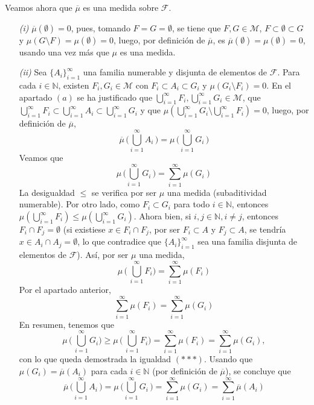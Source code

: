 \documentclass[11pt]{report}
\newcommand{\N}{\mathbb N}
\newcommand{\F}{\mathcal F}
\newcommand{\M}{\mathcal M}
\begin{document}
\begin{itemize}
    \vspace{2mm}

    Veamos ahora que $\overline{\mu}$ es una medida sobre $\F$.
    \begin{itemize}
        \item[\textit{(i)}] $\overline{\mu}(\emptyset)=0$, pues, tomando $F=G=\emptyset$, se tiene que $F,G \in \M$, $F \subset \emptyset \subset G$ y $\mu(G \setminus F) = \mu(\emptyset)=0$, luego, por definición de $\overline{\mu}$, es $\overline{\mu}(\emptyset) = \mu(\emptyset) = 0$, usando una vez más que $\mu$ es una medida.
        \item[\textit{(ii)}] Sea $\{A_i\}_{i=1}^\infty$ una familia numerable y disjunta de elementos de $\F$. Para cada $i \in \N$, existen $F_i,G_i \in \M$ con $F_i \subset A_i \subset G_i$ y $\mu(G_i \setminus F_i) = 0$. En el apartado $(a)$ se ha justificado que $\bigcup_{i=1}^\infty F_i,\bigcup_{i=1}^\infty G_i \in \M$, que $\bigcup_{i=1}^\infty F_i \subset \bigcup_{i=1}^\infty A_i \subset \bigcup_{i=1}^\infty G_i$ y que $\mu(\bigcup_{i=1}^\infty G_i \setminus \bigcup_{i=1}^\infty F_i) = 0$, luego, por definición de $\overline{\mu}$,
        \[\overline{\mu}\,\biggl(\bigcup_{i=1}^\infty A_i\,\biggr) = \mu\,\biggl(\bigcup_{i=1}^\infty G_i\,\biggr)\]
        Veamos que
        \[\mu\,\biggl(\bigcup_{i=1}^\infty G_i\,\biggr)=\sum_{i=1}^\infty \mu(G_i) \tag{$\ast\ast\ast$}\]
        La desigualdad $\leq$ se verifica por ser $\mu$ una medida (subaditividad numerable). Por otro lado, como $F_i \subset G_i$ para todo $i \in \N$, entonces $\mu(\bigcup_{i=1}^\infty F_i) \leq \mu(\bigcup_{i=1}^\infty G_i)$. Ahora bien, si $i,j \in \N, i \neq j$, entonces $F_i \cap F_j = \emptyset$ (si existiese $x \in F_i \cap F_j$, por ser $F_i \subset A$ y $F_j \subset A$, se tendría $x \in A_i \cap A_j=\emptyset$, lo que contradice que $\{A_i\}_{i=1}^\infty$ sea una familia disjunta de elementos de $\mathcal{F}$). Así, por ser $\mu$ una medida,
        \[\mu\,\biggl(\,\bigcup_{i=1}^\infty F_i \biggr)= \sum_{i=1}^\infty \mu(F_i)\]
        Por el apartado anterior,
        \[\sum_{i=1}^\infty \mu(F_i) = \sum_{i=1}^\infty \mu(G_i)\]
        En resumen, tenemos que
        \[\mu\,\biggl(\,\bigcup_{i=1}^\infty G_i \biggr) \geq \mu\,\biggl(\,\bigcup_{i=1}^\infty F_i \biggr)= \sum_{i=1}^\infty \mu(F_i)= \sum_{i=1}^\infty \mu(G_i),\]
        con lo que queda demostrada la igualdad $(\ast\ast\ast)$. Usando que $\mu(G_i) = \overline{\mu}(A_i)$ para cada $i \in \N$ (por definición de $\overline{\mu}$), se concluye que
        \[\overline{\mu}\,\biggl(\bigcup_{i=1}^\infty A_i\,\biggr) = \mu\,\biggl(\bigcup_{i=1}^\infty G_i\,\biggr) = \sum_{i=1}^\infty \mu(G_i) = \sum_{i=1}^\infty \overline{\mu}(A_i)\]
    \end{itemize}


\end{itemize}
\end{document}
